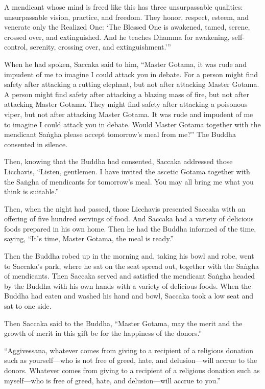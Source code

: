 \documentclass[12pt,openany]{book}%
\begin{document}
A mendicant whose mind is freed like this has three unsurpassable qualities: unsurpassable vision, practice, and freedom. They honor, respect, esteem, and venerate only the Realized One: ‘The Blessed One is awakened, tamed, serene, crossed over, and extinguished. And he teaches Dhamma for awakening, self-control, serenity, crossing over, and extinguishment.’” 

When he had spoken, Saccaka said to him, “Master Gotama, it was rude and impudent of me to imagine I could attack you in debate. For a person might find safety after attacking a rutting elephant, but not after attacking Master Gotama. A person might find safety after attacking a blazing mass of fire, but not after attacking Master Gotama. They might find safety after attacking a poisonous viper, but not after attacking Master Gotama. It was rude and impudent of me to imagine I could attack you in debate. Would Master Gotama together with the mendicant \textsanskrit{Saṅgha} please accept tomorrow’s meal from me?” The Buddha consented in silence. 

Then, knowing that the Buddha had consented, Saccaka addressed those Licchavis, “Listen, gentlemen. I have invited the ascetic Gotama together with the \textsanskrit{Saṅgha} of mendicants for tomorrow’s meal. You may all bring me what you think is suitable.” 

Then, when the night had passed, those Licchavis presented Saccaka with an offering of five hundred servings of food. And Saccaka had a variety of delicious foods prepared in his own home. Then he had the Buddha informed of the time, saying, “Itʼs time, Master Gotama, the meal is ready.” 

Then the Buddha robed up in the morning and, taking his bowl and robe, went to Saccaka’s park, where he sat on the seat spread out, together with the \textsanskrit{Saṅgha} of mendicants. Then Saccaka served and satisfied the mendicant \textsanskrit{Saṅgha} headed by the Buddha with his own hands with a variety of delicious foods. When the Buddha had eaten and washed his hand and bowl, Saccaka took a low seat and sat to one side. 

Then Saccaka said to the Buddha, “Master Gotama, may the merit and the growth of merit in this gift be for the happiness of the donors.” 

“Aggivessana, whatever comes from giving to a recipient of a religious donation such as yourself—who is not free of greed, hate, and delusion—will accrue to the donors. Whatever comes from giving to a recipient of a religious donation such as myself—who is free of greed, hate, and delusion—will accrue to you.” 
\end{document}
